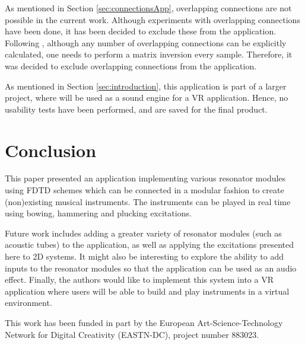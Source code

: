 \documentclass{article}
\def\SWcomment[#1]{\textcolor{blue}{#1}}
\begin{document}

As mentioned in Section \ref{sec:connectionsApp}, overlapping connections are not possible in the current work. Although experiments with overlapping connections have been done, it has been decided to exclude these from the application. Following \cite{Bilbao2009Modular}, although any number of overlapping connections can be explicitly calculated, one needs to perform a matrix inversion every sample. Therefore, it was decided to exclude overlapping connections from the application. 

As mentioned in Section \ref{sec:introduction}, this application is part of a larger project, where will be used as a sound engine for a VR application. Hence, no usability tests have been performed, and are saved for the final product.


\section{Conclusion}\label{sec:conclusion}
This paper presented an application implementing various resonator modules using FDTD schemes which can be connected in a modular fashion to create (non)existing musical instruments. The instruments can be played in real time using bowing, hammering and plucking excitations.

Future work includes adding a greater variety of resonator modules (such as acoustic tubes) to the application, as well as applying the excitations presented here to 2D systems. It might also be interesting to explore the ability to add inputs to the resonator modules so that the application can be used as an audio effect. 
Finally, the authors would like to implement this system into a VR application where users will be able to build and play instruments in a virtual environment. 

\begin{acknowledgments}
This work has been funded in part by the European Art-Science-Technology Network for Digital Creativity (EASTN-DC), project number 883023.
\end{acknowledgments} 

{\small

}
\end{document}
